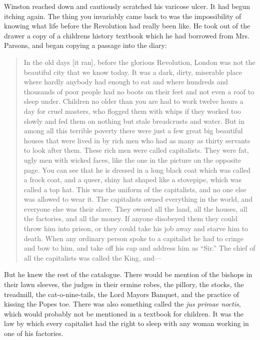 Winston reached down and cautiously scra\-tched his varicose ulcer. It had
begun itching again. The thing you invariably came back to was the
impossibility of knowing what life before the Revolution had really been
like. He took out of the drawer a copy of a children\textquotesingle s
history textbook which he had borrowed from Mrs. Parsons, and began
copying a passage into the diary:

\begin{quotation}
  In the old days [it ran], before the glorious Revolution, London was not
  the beautiful city that we know today. It was a dark, dirty, miserable
  place where hardly anybody had enough to eat and where hundreds and
  thousands of poor people had no boots on their feet and not even a roof to
  sleep under. Children no older than you are had to work twelve hours a day
  for cruel masters, who flogged them with whips if they worked too slowly
  and fed them on nothing but stale breadcrusts and water. But in among all
  this terrible poverty there were just a few great big beautiful houses
  that were lived in by rich men who had as many as thirty servants to look
  after them. These rich men were called capitalists. They were fat, ugly
  men with wicked faces, like the one in the picture on the opposite page.
  You can see that he is dressed in a long black coat which was called a
  frock coat, and a queer, shiny hat shaped like a stovepipe, which was
  called a top hat. This was the uniform of the capitalists, and no one else
  was allowed to wear it. The capitalists owned everything in the world, and
  everyone else was their slave. They owned all the land, all the houses,
  all the factories, and all the money. If anyone disobeyed them they could
  throw him into prison, or they could take his job away and starve him to
  death. When any ordinary person spoke to a capitalist he had to cringe and
  bow to him, and take off his cap and address him as ``Sir.'' The chief of
  all the capitalists was called the King, and---
\end{quotation}

But he knew the rest of the catalogue. There would be mention of the
bishops in their lawn sleeves, the judges in their ermine robes, the
pillory, the stocks, the treadmill, the
cat-o\textquotesingle-nine-tails, the Lord Mayor\textquotesingle s
Banquet, and the practice of kissing the Pope\textquotesingle s toe.
There was also something called the \emph{jus primae noctis}, which
would probably not be mentioned in a textbook for children. It was the
law by which every capitalist had the right to sleep with any woman
working in one of his factories.

